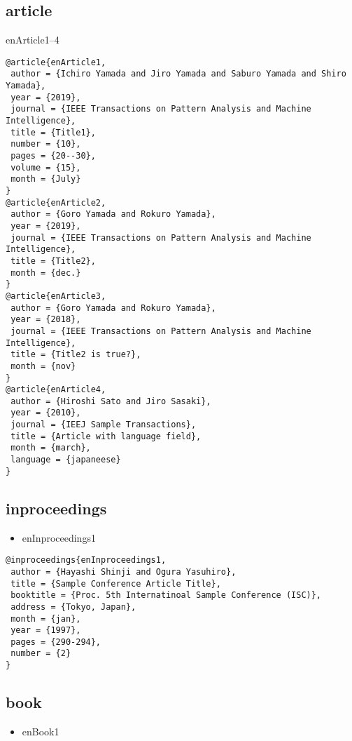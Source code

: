 \documentclass[9pt, twocolumn, a4paper]{jsarticle}
\begin{document}
\begin{bibunit}[jIEEEtran]

\subsection{article}

enArticle1--4\cite{enArticle1,enArticle2,enArticle3,enArticle4}

\begin{lstlisting}
@article{enArticle1,
 author = {Ichiro Yamada and Jiro Yamada and Saburo Yamada and Shiro Yamada},
 year = {2019},
 journal = {IEEE Transactions on Pattern Analysis and Machine Intelligence},
 title = {Title1},
 number = {10},
 pages = {20--30},
 volume = {15},
 month = {July}
}
@article{enArticle2,
 author = {Goro Yamada and Rokuro Yamada},
 year = {2019},
 journal = {IEEE Transactions on Pattern Analysis and Machine Intelligence},
 title = {Title2},
 month = {dec.}
}
@article{enArticle3,
 author = {Goro Yamada and Rokuro Yamada},
 year = {2018},
 journal = {IEEE Transactions on Pattern Analysis and Machine Intelligence},
 title = {Title2 is true?},
 month = {nov}
}
@article{enArticle4,
 author = {Hiroshi Sato and Jiro Sasaki},
 year = {2010},
 journal = {IEEJ Sample Transactions},
 title = {Article with language field},
 month = {march},
 language = {japaneese}
}
\end{lstlisting}

\subsection{inproceedings}

\begin{itemize}
  \item enInproceedings1 \cite{enInproceedings1}
\end{itemize}

\begin{lstlisting}
@inproceedings{enInproceedings1,
 author = {Hayashi Shinji and Ogura Yasuhiro},
 title = {Sample Conference Article Title},
 booktitle = {Proc. 5th Internatinoal Sample Conference (ISC)},
 address = {Tokyo, Japan},
 month = {jan},
 year = {1997},
 pages = {290-294},
 number = {2}
}
\end{lstlisting}

\subsection{book}

\begin{itemize}
  \item enBook1 \cite{enBook1}
\end{itemize}


\end{bibunit}
\end{document}
